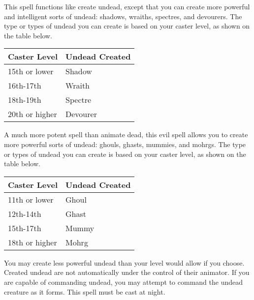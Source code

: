 \begin{multicols}{2}
\begin{small}

\smallskip\noindent This spell functions like create undead, except that you can create more powerful and intelligent sorts of undead: shadows, wraiths, spectres, and devourers. The type or types of undead you can create is based on your caster level, as shown on the table below.

\begin{center}
\begin{tabular}[h!]{l|l}
Caster Level & Undead Created \\ \hline
15th or lower & Shadow \\
16th-17th & Wraith \\
18th-19th & Spectre	\\
20th or higher & Devourer \\
\end{tabular}
\end{center}

\noindent A much more potent spell than animate dead, this evil spell allows you to create more powerful sorts of undead: ghouls, ghasts, mummies, and mohrgs. The type or types of undead you can create is based on your caster level, as shown on the table below.

\begin{center}
\begin{tabular}[h!]{l|l}
Caster Level & Undead Created \\ \hline   
11th or lower & Ghoul \\
12th-14th & Ghast	\\
15th-17th & Mummy \\
18th or higher & Mohrg \\
\end{tabular}
\end{center}

\smallskip\noindent You may create less powerful undead than your level would allow if you choose. Created undead are not automatically under the control of their animator. If you are capable of commanding undead, you may attempt to command the undead creature as it forms.
This spell must be cast at night.


\end{small}
\end{multicols}
